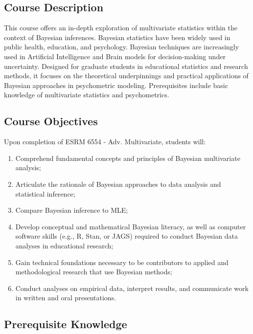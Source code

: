 \documentclass[
  letterpaper,
  DIV=11,
  numbers=noendperiod]{scrartcl}
\providecommand{\tightlist}{%
  \setlength{\itemsep}{0pt}\setlength{\parskip}{0pt}}\usepackage{longtable,booktabs,array}
\begin{document}
\hypertarget{course-description}{%
\subsection{Course Description}\label{course-description}}

This course offers an in-depth exploration of multivariate statistics
within the context of Bayesian inferences. Bayesian statistics have been
widely used in public health, education, and psychology. Bayesian
techniques are increasingly used in Artificial Intelligence and Brain
models for decision-making under uncertainty. Designed for graduate
students in educational statistics and research methods, it focuses on
the theoretical underpinnings and practical applications of Bayesian
approaches in psychometric modeling. Prerequisites include basic
knowledge of multivariate statistics and psychometrics.

\hypertarget{course-objectives}{%
\subsection{Course Objectives}\label{course-objectives}}

Upon completion of ESRM 6554 - Adv. Multivariate, students will:

\begin{enumerate}
\def\labelenumi{\arabic{enumi}.}
\tightlist
\item
  Comprehend fundamental concepts and principles of Bayesian
  multivariate analysis;
\item
  Articulate the rationale of Bayesian approaches to data analysis and
  statistical inference;
\item
  Compare Bayesian inference to MLE;
\item
  Develop conceptual and mathematical Bayesian literacy, as well as
  computer software skills (e.g., R, Stan, or JAGS) required to conduct
  Bayesian data analyses in educational research;
\item
  Gain technical foundations necessary to be contributors to applied and
  methodological research that use Bayesian methods;
\item
  Conduct analyses on empirical data, interpret results, and communicate
  work in written and oral presentations.
\end{enumerate}

\hypertarget{prerequisite-knowledge}{%
\subsection{Prerequisite Knowledge}\label{prerequisite-knowledge}}
\end{document}
